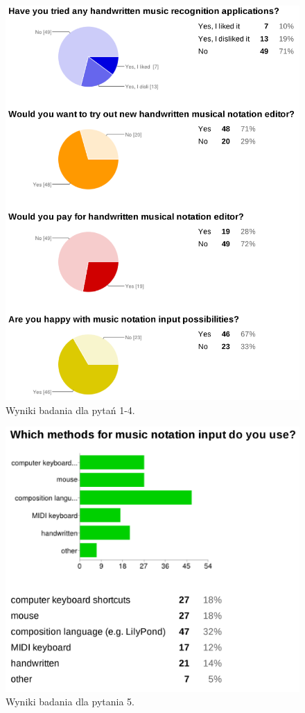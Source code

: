 \documentclass[polish,thesis,12pt]{dcsbook}
\begin{document}
\newpage
\begin{figure}[H]
  \centering
  \includegraphics[scale=0.15,bb=0 0 2832 3800]{img/survey1.png}
  \caption{Wyniki badania dla pytań 1-4.}
  \label{survey1}
\end{figure}
\begin{figure}[H]
  \centering
  \includegraphics[scale=0.2,bb=0 0 2232 2016]{img/survey2.png}
  \caption{Wyniki badania dla pytania 5.}
  \label{survey2}
\end{figure}
\end{document}
